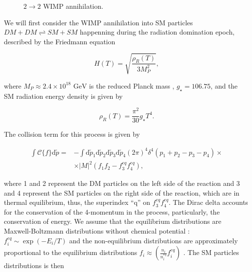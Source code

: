\documentclass[final,5p,times,twocolumn, nopreprintline]{elsarticle}
\numberwithin{equation}{section}
\begin{document}
\begin{figure}[h]
\begin{center}
\end{center}
\caption{$2\to2$ WIMP annihilation.}
\end{figure}\label{fig:wimp_an}

We will first consider the WIMP annihilation into SM particles $DM+DM\rightleftharpoons SM+SM$ happenning during the radiation domination epoch, described by the Friedmann equation

\begin{equation}
H(T)=\sqrt{\dfrac{\rho_R(T)}{3M_P^2}}, \label{eq:hubble_rate}
\end{equation}

where $M_P\approx 2.4\times10^{18}\text{ GeV}$ is the reduced Planck mass \cite{mambrini2021particles}, $g_\star=106.75$, and the SM radiation energy density is given by

\begin{equation}
\rho_R(T)=\dfrac{\pi^2}{30}g_\star T^4. \label{eq:rad_dens}
\end{equation}

The collision term for this process is given by \cite{baumann2022cosmology}

\begin{align}
\int\mathcal{C}\{f\}\mathrm{d}\tilde{p}=&-\int\mathrm{d}\tilde{p}_1\mathrm{d}\tilde{p}_2\mathrm{d}\tilde{p}_3\mathrm{d}\tilde{p}_4(2\pi)^4\delta^4(p_1+p_2-p_3-p_4)\times\nonumber\\&\times|M|^2(f_1f_2-f_3^{eq}f_4^{eq}), \label{eq:col_22}
\end{align}

where 1 and 2 represent the DM particles on the left side of the reaction and 3 and 4 represent the SM particles on the right side of the reaction, which are in thermal equilibrium, thus, the superindex ``q'' on $f_3^{eq}f_4^{eq}$. The Dirac delta accounts for the conservation of the 4-momentum in the process, particularly, the conservation of energy. We assume that the equilibrium distributions are Maxwell-Boltzmann distributions without chemical potential \cite{kolb1991early}: $f_i^{eq}\sim \exp(-E_i/T)$ and the non-equilibrium distributions are approximately proportional to the equilibrium distributions $f_i\approx\left(\frac{n_i}{n_i^{eq}}f_i^{eq}\right)$ \citep{pierre2019dark}. The SM particles distributions is then
\end{document}
